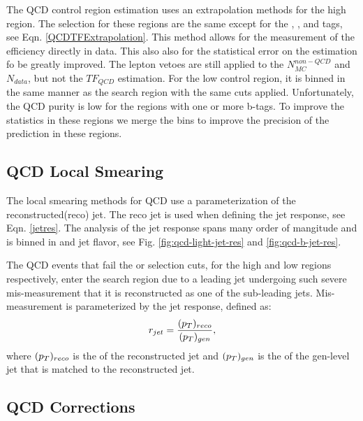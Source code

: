 The QCD control region estimation uses an extrapolation methods for the high \dm{} region. The selection for these regions are the same except for the \nt, \nrt, and \nw{} tags, see Eqn. \ref{QCDTFExtrapolation}. This method allows for the measurement of the efficiency directly in data. This also also for the statistical error on the estimation fo be greatly improved. The lepton vetoes are still applied to the $N_{MC}^{non-QCD}$ and $N_{data}$, but not the $TF_{QCD}$ estimation. For the low \dm{} control region, it is binned in the same manner as the search region with the same cuts applied. Unfortunately, the QCD purity is low for the regions with one or more b-tags. To improve the statistics in these regions we merge the \met{} bins to improve the precision of the prediction in these regions. 

\subsection{QCD Local Smearing}\label{Smearing}

The local smearing methods for QCD use a parameterization of the reconstructed(reco) jet. The reco jet is used when defining the jet response, see Eqn. \ref{jetres}. The analysis of the jet response spans many order of mangitude and is binned in \pt{} and jet flavor, see Fig. \ref{fig:qcd-light-jet-res} and \ref{fig:qcd-b-jet-res}. 

The QCD events that fail the \highdm{} or \lowdm{} selection cuts, for the high and low \dm{} regions respectively, enter the search region due to a leading jet undergoing such severe mis-measurement that it is reconstructed as one of the sub-leading jets. Mis-measurement is parameterized by the jet response, defined as:
\begin{equation}\label{jetres}
r_{jet}=\frac{(p_{T})_{reco}}{(p_{T})_{gen}},
\end{equation}
where $(p_{T})_{reco}$ is the \pt{} of the reconstructed jet and $(p_{T})_{gen}$ is the \pt{} of the gen-level jet that is matched to the reconstructed jet.

\subsection{QCD Corrections}

